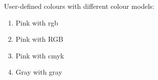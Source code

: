 \documentclass{article}
\begin{document}
User-defined colours with different colour models:
 
\begin{enumerate}
\item \textcolor{mypink1}{Pink with rgb}
\item \textcolor{mypink2}{Pink with RGB}
\item \textcolor{mypink3}{Pink with cmyk}
\item \textcolor{mygray}{Gray with gray}
\end{enumerate}
 
\end{document}
